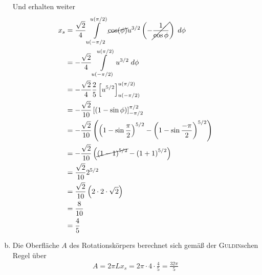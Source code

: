 \documentclass[a4paper,german,12pt,smallheadings]{scrartcl}
\begin{document}
\begin{enumerate}[a)]
    Und erhalten weiter
    \begin{align*}
      x_s &= \frac{\sqrt{2}}{4} \int\limits_{u(-\pi/2}^{u(\pi/2)} \cancel{\cos(\phi)} u^{3/2} \left(-\cancel{\frac{1}{\cos \phi}}\right) \; d\phi \\
          &= -\frac{\sqrt{2}}{4} \int\limits_{u(-\pi/2)}^{u(\pi/2)} u^{3/2} \; d\phi \\
          &= -\frac{\sqrt{2}}{4} \frac{2}{5} \left[u^{5/2}\right]_{u(-\pi/2)}^{u(\pi/2)} \\
          &= -\frac{\sqrt{2}}{10}\left[(1-\sin \phi)\right]_{-\pi/2}^{\pi/2} \\
          &= -\frac{\sqrt{2}}{10} \left(\left(1-\sin \frac{\pi}{2}\right)^{5/2} - \left(1-\sin \frac{-\pi}{2}\right)^{5/2}\right) \\
          &= -\frac{\sqrt{2}}{10} \left(\cancel{\left(1-1\right)^{5/2}} - \left(1+1\right)^{5/2}\right) \\
          &= \frac{\sqrt{2}}{10} 2^{5/2} \\
          &= \frac{\sqrt{2}}{10} \left(2\cdot2\cdot\sqrt{2}\right) \\
          &= \frac{8}{10} \\
          &= \frac{4}{5} \\
    \end{align*}
  \item
    Die Oberfläche $A$ des Rotationskörpers berechnet sich gemäß der
    \textsc{Guldin}schen Regel über
    \begin{align*}
      A = 2 \pi L x_s = 2 \pi \cdot 4 \cdot \frac{4}{5} = \frac{32 \pi}{5}
    \end{align*}

\end{enumerate}
\end{document}
